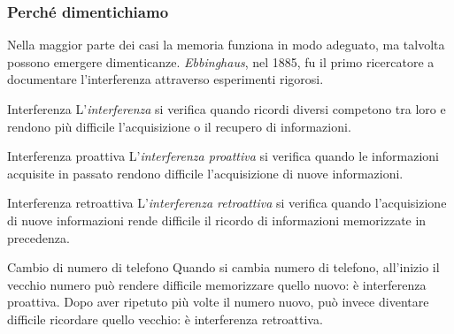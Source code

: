 \documentclass[a4paper]{article}
\begin{document}
\subsubsection{Perché dimentichiamo}
Nella maggior parte dei casi la memoria funziona in modo adeguato, ma talvolta possono emergere dimenticanze. \emph{Ebbinghaus}, nel 1885, fu il primo ricercatore a documentare l'interferenza attraverso esperimenti rigorosi.
\begin{snippetdefinition}{Interferenza}
    L'\emph{interferenza} si verifica quando ricordi diversi competono tra loro e rendono più difficile l'acquisizione o il recupero di informazioni.
\end{snippetdefinition}
\begin{snippetdefinition}{Interferenza proattiva}
    L'\emph{interferenza proattiva} si verifica quando le informazioni acquisite in passato rendono difficile l'acquisizione di nuove informazioni.
\end{snippetdefinition}
\begin{snippetdefinition}{Interferenza retroattiva}
    L'\emph{interferenza retroattiva} si verifica quando l'acquisizione di nuove informazioni rende difficile il ricordo di informazioni memorizzate in precedenza.
\end{snippetdefinition}
\begin{snippetexample}{Cambio di numero di telefono}
    Quando si cambia numero di telefono, all'inizio il vecchio numero può rendere difficile memorizzare quello nuovo: è interferenza proattiva. Dopo aver ripetuto più volte il numero nuovo, può invece diventare difficile ricordare quello vecchio: è interferenza retroattiva.
\end{snippetexample}
\end{document}
